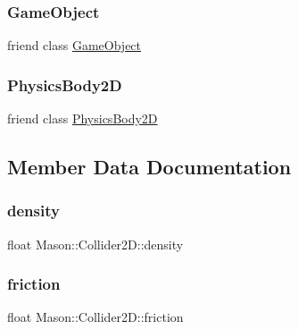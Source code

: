 \subsubsection{\texorpdfstring{Game\+Object}{GameObject}}
{\footnotesize\ttfamily friend class \hyperlink{class_mason_1_1_game_object}{Game\+Object}\hspace{0.3cm}{\ttfamily [friend]}}

\hypertarget{class_mason_1_1_collider2_d_a60dcb177f208afef9864b04ec483a960}{}\label{class_mason_1_1_collider2_d_a60dcb177f208afef9864b04ec483a960} 
\subsubsection{\texorpdfstring{Physics\+Body2D}{PhysicsBody2D}}
{\footnotesize\ttfamily friend class \hyperlink{class_mason_1_1_physics_body2_d}{Physics\+Body2D}\hspace{0.3cm}{\ttfamily [friend]}}



\subsection{Member Data Documentation}
\hypertarget{class_mason_1_1_collider2_d_ad3b9178c829dbe0a8a25a75d643f8744}{}\label{class_mason_1_1_collider2_d_ad3b9178c829dbe0a8a25a75d643f8744} 
\subsubsection{\texorpdfstring{density}{density}}
{\footnotesize\ttfamily float Mason\+::\+Collider2\+D\+::density\hspace{0.3cm}{\ttfamily [protected]}}

\hypertarget{class_mason_1_1_collider2_d_ab08954cffa1ac7539e26c4e2da535481}{}\label{class_mason_1_1_collider2_d_ab08954cffa1ac7539e26c4e2da535481} 
\subsubsection{\texorpdfstring{friction}{friction}}
{\footnotesize\ttfamily float Mason\+::\+Collider2\+D\+::friction\hspace{0.3cm}{\ttfamily [protected]}}

